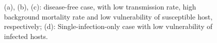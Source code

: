 \documentclass{beamer}
\begin{document}
	\begin{frame}
		\begin{figure}[htbp]
			\label{Figure 13}
			\centering
			\qquad
			\caption{\tiny (a), (b), (c): disease-free case, with low transmission rate, high background mortality rate and low vulnerability of susceptible host, respectively; (d): Single-infection-only case with low vulnerability of infected hosts.}
		\end{figure}
	\end{frame}
\end{document}
